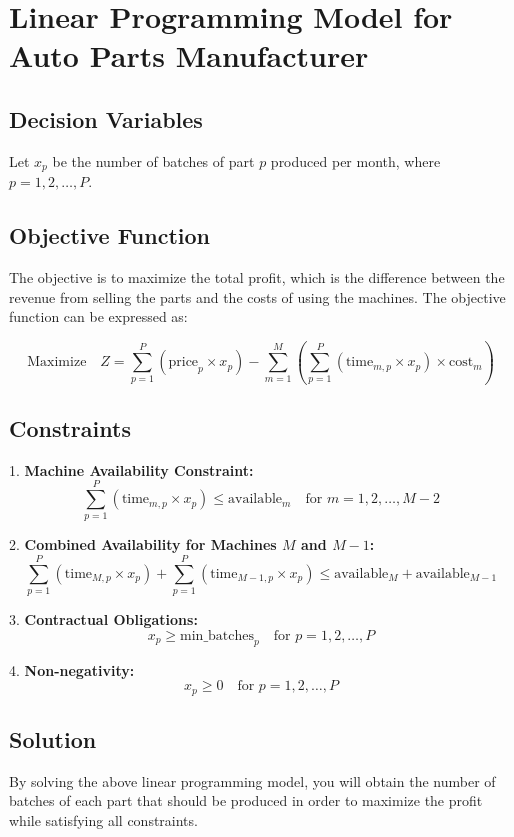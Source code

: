 \documentclass{article}
\begin{document}
\section*{Linear Programming Model for Auto Parts Manufacturer}

\subsection*{Decision Variables}
Let \( x_p \) be the number of batches of part \( p \) produced per month, where \( p = 1, 2, \ldots, P \).

\subsection*{Objective Function}
The objective is to maximize the total profit, which is the difference between the revenue from selling the parts and the costs of using the machines. The objective function can be expressed as:

\[
\text{Maximize} \quad Z = \sum_{p=1}^{P} (\text{price}_p \times x_p) - \sum_{m=1}^{M} \left( \sum_{p=1}^{P} (\text{time}_{m,p} \times x_p) \times \text{cost}_m \right)
\]

\subsection*{Constraints}

1. \textbf{Machine Availability Constraint:}
   \[
   \sum_{p=1}^{P} (\text{time}_{m,p} \times x_p) \leq \text{available}_m \quad \text{for } m = 1, 2, \ldots, M-2
   \]

2. \textbf{Combined Availability for Machines \( M \) and \( M-1 \):}
   \[
   \sum_{p=1}^{P} (\text{time}_{M,p} \times x_p) + \sum_{p=1}^{P} (\text{time}_{M-1,p} \times x_p) \leq \text{available}_M + \text{available}_{M-1}
   \]

3. \textbf{Contractual Obligations:}
   \[
   x_p \geq \text{min\_batches}_p \quad \text{for } p = 1, 2, \ldots, P
   \]

4. \textbf{Non-negativity:}
   \[
   x_p \geq 0 \quad \text{for } p = 1, 2, \ldots, P
   \]

\subsection*{Solution}
By solving the above linear programming model, you will obtain the number of batches of each part that should be produced in order to maximize the profit while satisfying all constraints.
\end{document}
